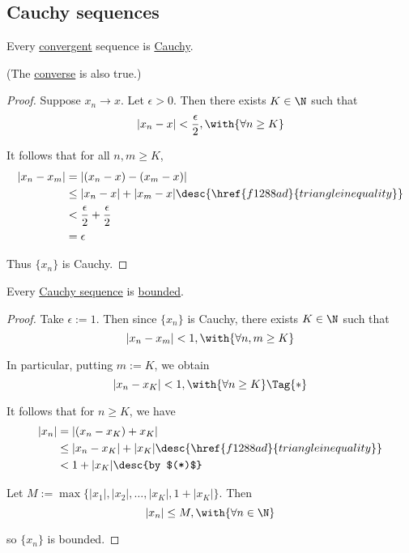 \subsection{Cauchy sequences}\label{d1034e6}

\label{a1534e3}

Every \href{de3e28a}{convergent} sequence is \href{a8f670d}{Cauchy}.

(The \href{a537c7e}{converse} is also true.)

\begin{proof}
  Suppose $x_n\to x$. Let $\epsilon>0$. Then there exists $K\in\N$ such that
  $$
    |x_n-x|<\frac\epsilon2,\with{\forall n\geq K}
  $$

  It follows that for all $n,m\geq K$,
  \begin{align*}
    |x_n-x_m| &=|(x_n-x)-(x_m-x)|                                            \\
              &\leq|x_n-x|+|x_m-x|\desc{\href{f1288ad}{triangle inequality}} \\
              &<\frac\epsilon2+\frac\epsilon2                                \\
              &=\epsilon
  \end{align*}

  Thus $\{x_n\}$ is Cauchy.
\end{proof}

\label{e6e340b}

Every \href{a8f670d}{Cauchy sequence} is \href{d5ed299}{bounded}.

\begin{proof}
  Take $\epsilon:=1$. Then since $\{x_n\}$ is Cauchy, there exists $K\in\N$
  such that
  $$
    |x_n-x_m|<1,\with{\forall n,m\geq K}
  $$

  In particular, putting $m:=K$, we obtain
  \begin{equation*}
    |x_n-x_K|<1,\with{\forall n\geq K}\Tag{*}
  \end{equation*}

  It follows that for $n\geq K$, we have
  \begin{align*}
    |x_n| &=|(x_n-x_K)+x_K|                                              \\
          &\leq|x_n-x_K|+|x_K|\desc{\href{f1288ad}{triangle inequality}} \\
          &<1+|x_K|\desc{by $(*)$}
  \end{align*}

  Let $M:=\max\{|x_1|,|x_2|,\ldots,|x_K|,1+|x_K|\}$. Then
  $$
    |x_n|\leq M,\with{\forall n\in\N}
  $$

  so $\{x_n\}$ is bounded.
\end{proof}

